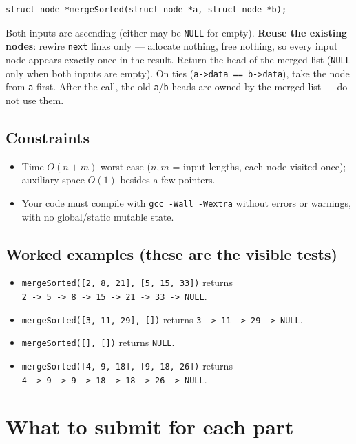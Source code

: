 \documentclass[11pt]{article}
\begin{document}
\begin{verbatim}
struct node *mergeSorted(struct node *a, struct node *b);
\end{verbatim}

Both inputs are ascending (either may be \texttt{NULL} for empty). \textbf{Reuse the existing nodes}: rewire \texttt{next} links only --- allocate nothing, free nothing, so every input node appears exactly once in the result. Return the head of the merged list (\texttt{NULL} only when both inputs are empty). On ties (\texttt{a->data == b->data}), take the node from \texttt{a} first. After the call, the old \texttt{a}/\texttt{b} heads are owned by the merged list --- do not use them.

\subsection{Constraints}

\begin{itemize}
  \item Time $O(n+m)$ worst case ($n, m$ = input lengths, each node visited once); auxiliary space $O(1)$ besides a few pointers.
  \item Your code must compile with \texttt{gcc -Wall -Wextra} without errors or warnings, with no global/static mutable state.
\end{itemize}

\subsection{Worked examples (these are the visible tests)}

\begin{itemize}
  \item \texttt{mergeSorted([2, 8, 21], [5, 15, 33])} returns\\ \texttt{2 -> 5 -> 8 -> 15 -> 21 -> 33 -> NULL}.
  \item \texttt{mergeSorted([3, 11, 29], [])} returns \texttt{3 -> 11 -> 29 -> NULL}.
  \item \texttt{mergeSorted([], [])} returns \texttt{NULL}.
  \item \texttt{mergeSorted([4, 9, 18], [9, 18, 26])} returns\\ \texttt{4 -> 9 -> 9 -> 18 -> 18 -> 26 -> NULL}.
\end{itemize}

\section{What to submit for each part}
\end{document}
